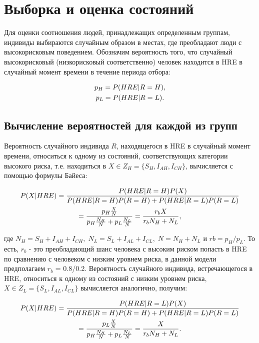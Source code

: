 \documentclass[a4paper]{report}
\begin{document}
	\chapter{Выборка и оценка состояний}
	
	Для оценки соотношения людей, принадлежащих определенным группам, индивиды  выбираются  случайным  образом  в  местах, где преобладают люди с высокорисковым поведением.
	Обозначим вероятность того, что случайный высокорисковый (низкорисковый соответственно) человек находится в HRE в случайный момент времени в течение периода отбора:
	
	\begin{gather}
		p_H = P(HRE | R = H), \notag \\
		p_L = P(HRE | R = L). \notag
	\end{gather}
	
	\section{Вычисление вероятностей для каждой из групп }
	
	Вероятность случайного индивида $R$, находящегося в HRE в случайный момент времени, относиться к одному из состояний, соответствующих категории высокого риска, т.е. находиться в $X \in Z_H = \{S_H, I_{AH}, I_{CH}\}$, вычисляется с помощью формулы Байеса:
	
	\begin{gather}
		P(X | HRE)= {{P(HRE | R = H)P(X)}\over{P(HRE | R = H)P(R = H) + P(HRE | R = L)P(R = L)}} \notag \\
		= {{p_H {{X} \over {N}}} \over {p_H {{N_H} \over {N}} + p_L {{N_L} \over {N}}}} = {{r_b X} \over {r_b N_H + N_L}}, \label{eq1}
	\end{gather}
	
	где $N_H = S_H + I_{AH} + I_{CH}, \; N_L = S_L + I_{AL} + I_{CL}, \; N = N_H + N_L$ и $rb = p_H / p_L$. То есть, $r_b$ - это преобладающий шанс человека с высоким риском попасть в HRE по сравнению с человеком с низким уровнем риска, в данной модели предполагаем $r_b$ = 0.8/0.2.
	Вероятность случайного индивида, встречающегося в HRE, относиться к одному из состояний с низким уровнем риска, $X \in Z_L = \{S_L, I_{AL}, I_{CL}\}$ вычисляется аналогично, получим:
	
	\begin{gather}
		P(X | HRE)= {{P(HRE | R = L)P(X)}\over{P(HRE | R = H)P(R = H) + P(HRE | R = L)P(R = L)}} \notag \\
		= {{p_L {{X} \over {N}}} \over {p_H {{N_H} \over {N}} + p_L {{N_L} \over {N}}}} = {{X} \over {r_b N_H + N_L}}. \label{eq2}
	\end{gather}
	
\end{document}
